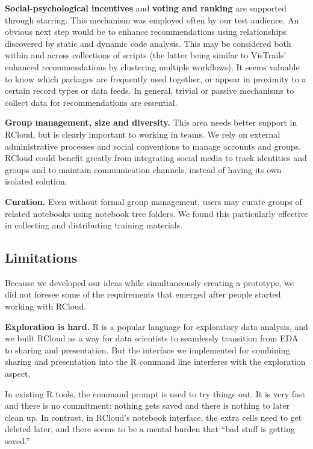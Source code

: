 {\bf Social-psychological incentives} and {\bf voting and ranking} are supported
through starring. This mechanism was employed often by our test
audience.  An obvious next step would be to enhance recommendations using
relationships discovered by static and dynamic code analysis. This may be
considered both within and across collections of scripts (the latter being
similar to VisTrails' enhanced recommendations by clustering multiple
workflows).  It seems valuable to know which packages are frequently used
together, or appear in proximity to a certain record types or data feeds.  In
general, trivial or passive mechanisms to collect data for recommendations are
essential.

{\bf Group management, size and diversity.} This area needs better
support in RCloud, but is clearly important to working in teams.
We rely on external administrative processes and social conventions
to manage accounts and groups. RCloud could benefit greatly from
integrating social media to track identities and groups and to maintain
communication channels, instead of having its own isolated solution.

{\bf Curation.} Even without formal group management, users may
curate groups of related notebooks using notebook tree folders.
We found this particularly effective in collecting and distributing
training materials.

\subsection{Limitations}
Because we developed our ideas while simultaneously creating a prototype,
we did not foresee some of the requirements that emerged after
people started working with RCloud.

{\bf Exploration is hard.}
R is a popular language for exploratory data analysis, and we built RCloud
as a way for data scientists to seamlessly transition from EDA to sharing
and presentation. But the interface we implemented for combining sharing and presentation
into the R command line interferes with the exploration aspect.

In existing R tools, the command prompt is used to try things out. It is very
fast and there is no commitment: nothing gets saved and there is nothing to
later clean up. In contrast, in RCloud's notebook interface, the extra cells need
to get deleted later, and there seems to be a mental burden that ``bad stuff
is getting saved.''

